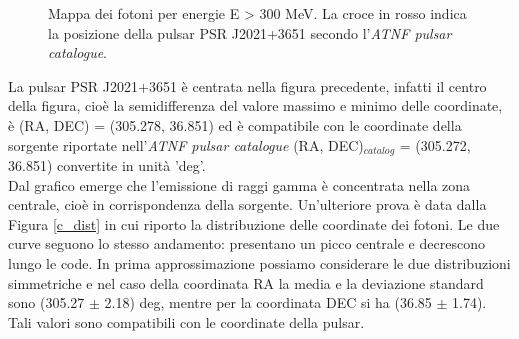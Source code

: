 \documentclass[a4paper,twocolumn]{article}
\begin{document}
\begin{large}
\begin{figure}[h]
    \caption{\small Mappa dei fotoni per energie E > 300 MeV. La croce in rosso indica la posizione della pulsar PSR J2021+3651 secondo l'\textit{ATNF pulsar catalogue}.}
    \label{cmap300}
\end{figure}


\noindent
La pulsar PSR J2021+3651 è centrata nella figura precedente, infatti il centro della figura, cioè la semidifferenza del valore massimo e minimo delle coordinate, è (RA, DEC) = (305.278, 36.851) ed è compatibile con le coordinate della sorgente riportate nell'\textit{ATNF pulsar catalogue} (RA, DEC)$_{catalog}$ = (305.272, 36.851) convertite in unità 'deg'.\\
Dal grafico emerge che l'emissione di raggi gamma è concentrata nella zona centrale, cioè in corrispondenza della sorgente.
Un'ulteriore prova è data dalla Figura \ref{c_dist} in cui riporto la distribuzione delle coordinate dei fotoni. Le due curve seguono lo stesso andamento: presentano un picco centrale e decrescono lungo le code. In prima approssimazione possiamo considerare le due distribuzioni simmetriche e nel caso della coordinata RA la media e la deviazione standard sono (305.27 $\pm$ 2.18) deg, mentre per la coordinata DEC si ha (36.85 $\pm$ 1.74). Tali valori sono compatibili con le coordinate della pulsar.


\end{large}
\end{document}
